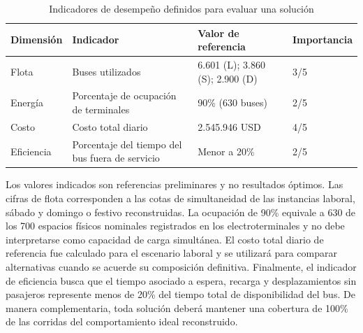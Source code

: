 \begin{table}[H]
\centering
\caption{Indicadores de desempeño definidos para evaluar una solución}
\label{tab:kpis_proyecto}
\small
\begin{tabular}{p{}p{}p{}p{}}
\toprule
\textbf{Dimensión} & \textbf{Indicador} & \textbf{Valor de referencia} &
\textbf{Importancia} \\
\midrule
Flota & Buses utilizados & 6.601 (L); 3.860 (S); 2.900 (D) & 3/5 \\
Energía & Porcentaje de ocupación de terminales & 90\% (630 buses) & 2/5 \\
Costo & Costo total diario & 2.545.946 USD & 4/5 \\
Eficiencia & Porcentaje del tiempo del bus fuera de servicio & Menor a 20\% & 2/5 \\
\bottomrule
\end{tabular}
\end{table}

Los valores indicados son referencias preliminares y no resultados óptimos. Las
cifras de flota corresponden a las cotas de simultaneidad de las instancias
laboral, sábado y domingo o festivo reconstruidas. La ocupación de 90\% equivale
a 630 de los 700 espacios
físicos nominales registrados en los electroterminales y no debe interpretarse
como capacidad de carga simultánea. El costo total diario de referencia fue
calculado para el escenario laboral y se utilizará para comparar alternativas
cuando se acuerde su composición definitiva. Finalmente,
el indicador de eficiencia busca que el tiempo asociado a espera, recarga y
desplazamientos sin pasajeros represente menos de 20\% del tiempo total de
disponibilidad del bus. De manera complementaria, toda solución deberá mantener
una cobertura de 100\% de las corridas del comportamiento ideal reconstruido.
